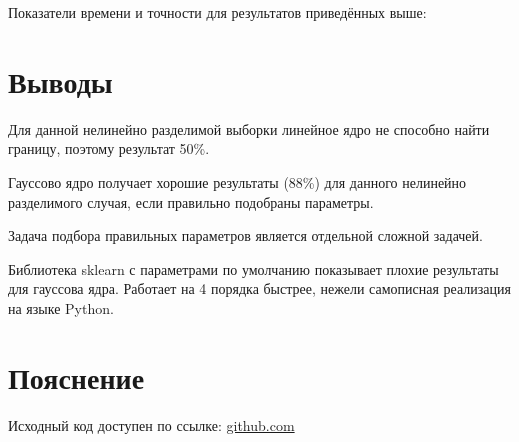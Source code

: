 \documentclass{article} %
\begin{document}
Показатели времени и точности для результатов приведённых выше:


\section{Выводы}
Для данной нелинейно разделимой выборки
линейное ядро не способно найти границу,
поэтому результат 50\%.

Гауссово ядро получает хорошие результаты (88\%)
для данного нелинейно разделимого случая,
если правильно подобраны параметры.

Задача подбора правильных параметров
является отдельной сложной задачей.

Библиотека sklearn с параметрами по умолчанию
показывает плохие результаты для гауссова ядра.
Работает на 4 порядка быстрее,
нежели самописная реализация на языке Python.

\section{Пояснение}
Исходный код доступен по ссылке:
\href{https://github.com/SvichkarevAnatoly/Course-Python-Bioinformatics/tree/master/semester2/task12}
{github.com}
\end{document}
